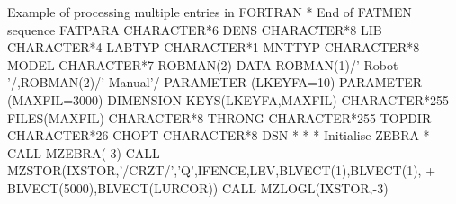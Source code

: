\begin{XMPt}{Example of processing multiple entries in FORTRAN}
* End of FATMEN sequence FATPARA                                        
      CHARACTER*6  DENS                                                 
      CHARACTER*8  LIB                                                  
      CHARACTER*4  LABTYP                                               
      CHARACTER*1  MNTTYP                                               
      CHARACTER*8  MODEL                                                
      CHARACTER*7  ROBMAN(2)                                            
      DATA         ROBMAN(1)/'-Robot '/,ROBMAN(2)/'-Manual'/            
      PARAMETER (LKEYFA=10)                                             
      PARAMETER (MAXFIL=3000)                                           
      DIMENSION KEYS(LKEYFA,MAXFIL)                                     
      CHARACTER*255 FILES(MAXFIL)                                       
      CHARACTER*8   THRONG                                              
      CHARACTER*255 TOPDIR                                              
      CHARACTER*26  CHOPT                                               
      CHARACTER*8   DSN                                                 
*                                                                       
*                                                                       
*     Initialise ZEBRA                                                  
*                                                                       
      CALL MZEBRA(-3)                                                   
      CALL MZSTOR(IXSTOR,'/CRZT/','Q',IFENCE,LEV,BLVECT(1),BLVECT(1),   
     +            BLVECT(5000),BLVECT(LURCOR))                          
      CALL MZLOGL(IXSTOR,-3)                                            
                                                                        

\end{XMPt}
